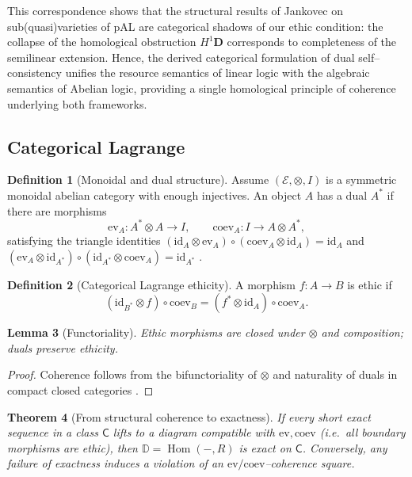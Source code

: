 \documentclass[12pt]{article}
\newcommand{\E}{\mathcal{E}}
\newcommand{\DD}{\mathbb{D}}
\newcommand{\Hom}{\operatorname{Hom}}
\newcommand{\id}{\mathrm{id}}
\newcommand{\coev}{\mathrm{coev}}
\newcommand{\ev}{\mathrm{ev}}
\theoremstyle{plain}
\newtheorem{theorem}{Theorem}[section]
\newtheorem{lemma}[theorem]{Lemma}
\theoremstyle{definition}
\newtheorem{definition}[theorem]{Definition}
\theoremstyle{remark}
\numberwithin{equation}{section}
\begin{document}
This correspondence shows that the structural results of Jankovec on sub(quasi)varieties of pAL are categorical shadows of our ethic condition: the collapse of the homological obstruction $H^1\mathbf D$ corresponds to completeness of the semilinear extension.  Hence, the derived categorical formulation of dual self--consistency unifies the resource semantics of linear logic with the algebraic semantics of Abelian logic, providing a single homological principle of coherence underlying both frameworks.

\subsection{Categorical Lagrange}\label{sec:step8}
\begin{definition}[Monoidal and dual structure]
Assume \((\E,\otimes,I)\) is a symmetric monoidal abelian category with enough injectives. An object \(A\) has a dual \(A^*\) if there are morphisms
\[
\ev_A: A^*\!\otimes A\to I,\qquad \coev_A: I\to A\otimes A^*,
\]
satisfying the triangle identities
\((\id_A\otimes \ev_A)\circ(\coev_A\otimes \id_A)=\id_A\) and \((\ev_A\otimes \id_{A^*})\circ(\id_{A^*}\otimes \coev_A)=\id_{A^*}\) \cite{Kelly1982,MacLane1998}.
\end{definition}

\begin{definition}[Categorical Lagrange ethicity]
A morphism \(f:A\to B\) is ethic if
\[
(\id_{B^*}\!\otimes f)\circ \coev_B = (f^*\!\otimes \id_A)\circ \coev_A.
\]
\end{definition}

\begin{lemma}[Functoriality]
Ethic morphisms are closed under \(\otimes\) and composition; duals preserve ethicity.
\end{lemma}

\begin{proof}
Coherence follows from the bifunctoriality of \(\otimes\) and naturality of duals in compact closed categories \cite{Kelly1982}.
\end{proof}

\begin{theorem}[From structural coherence to exactness]\label{thm:coh-exact}
If every short exact sequence in a class \(\mathsf{C}\) lifts to a diagram compatible with \(\ev,\coev\) (i.e.\ all boundary morphisms are ethic), then \(\DD=\Hom(-,R)\) is exact on \(\mathsf{C}\). Conversely, any failure of exactness induces a violation of an \(\ev/\coev\)--coherence square.
\end{theorem}
\end{document}
